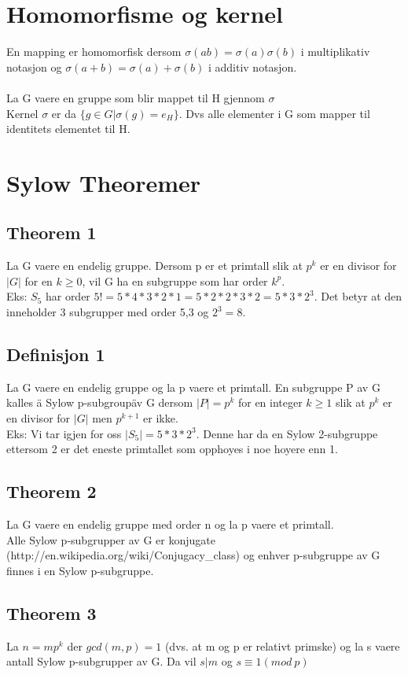 \documentclass[12pt,a4paper]{article}
\begin{document}
\section*{Homomorfisme og kernel}
En mapping er homomorfisk dersom $\sigma(ab) = \sigma(a) \sigma(b)$ i multiplikativ notasjon og $\sigma(a+b) = \sigma(a) + \sigma(b)$ i additiv notasjon. \\\\

La G vaere en gruppe som blir mappet til H gjennom $\sigma$\\
Kernel $\sigma$ er da $\{g\in G | \sigma(g) = e_H\}$. Dvs alle elementer i G som mapper til identitets elementet til H.

\section*{Sylow Theoremer}
\subsection*{Theorem 1}
La G vaere en endelig gruppe. Dersom p er et primtall slik at $p^k$ er en divisor for $|G|$ for en $k\geq0$, vil G ha en subgruppe som har order $k^p$. \\
Eks: $S_5$ har order $5! = 5*4*3*2*1 = 5*2*2*3*2 = 5*3*2^3$. Det betyr at den inneholder 3 subgrupper med order 5,3 og $2^3 = 8$.

\subsection*{Definisjon 1}
La G vaere en endelig gruppe og la p vaere et primtall. En subgruppe P av G kalles \"a Sylow p-subgroup\" av G  dersom $|P| = p^k$ for en integer $k\geq 1$ slik at $p^k$ er en divisor for $|G|$ men $p^{k+1}$ er ikke.\\
Eks: Vi tar igjen for oss $|S_5| = 5*3*2^3$. Denne har da en Sylow 2-subgruppe ettersom 2 er det eneste primtallet som opphoyes i noe hoyere enn 1. 

\subsection*{Theorem 2}
La G vaere en endelig gruppe med order n og la p vaere et primtall.\\
Alle Sylow p-subgrupper av G er konjugate (http://en.wikipedia.org/wiki/Conjugacy\_class) og enhver p-subgruppe av G finnes i en Sylow p-subgruppe. 

\subsection*{Theorem 3}
La $n = mp^k$ der $gcd(m,p) = 1$ (dvs. at m og p er relativt primske) og la s vaere antall Sylow p-subgrupper av G. Da vil $s | m $ og $s \equiv 1(mod\  p )$
\end{document}
